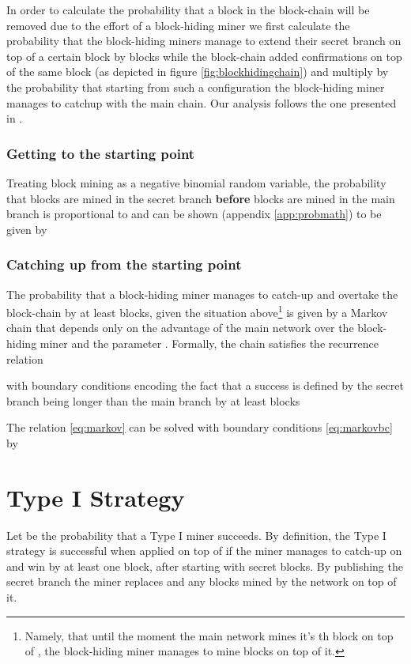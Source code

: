 \documentclass[letterpaper,12pt]{report}
\begin{document}
In order to calculate the probability that a block in the block-chain will be removed due to the effort of a block-hiding miner we first calculate the probability that the block-hiding miners manage to extend their secret branch on top of a certain block by  blocks while the block-chain added  confirmations on top of the same block (as depicted in figure \ref{fig:blockhidingchain}) and multiply by the probability that starting from such a configuration the block-hiding miner manages to catchup with the main chain. Our analysis follows the one presented in \cite{Doublespend}.

\subsection{Getting to the starting point}
Treating block mining as a negative binomial random variable, the probability  that  blocks are mined in the secret branch {\bf before}  blocks are mined in the main branch is proportional to  and can be shown
(appendix \ref{app:probmath}) to be given by



\subsection{Catching up from the starting point}
The probability  that a block-hiding miner manages to catch-up and overtake the block-chain by at least  blocks, given the situation above\footnote{Namely, that until the moment the main network mines it's th block on top of , the block-hiding miner manages to mine  blocks on top of it.} is given by a Markov chain that depends only on the advantage  of the main network over the block-hiding miner and the parameter . Formally, the chain satisfies the recurrence relation


with boundary conditions encoding the fact that a success is defined by the secret branch being longer than the main branch by at least  blocks



The relation \ref{eq:markov} can be solved with boundary conditions \ref{eq:markovbc} by 






\chapter{Type I Strategy}

Let  be the probability that a Type I miner succeeds. By definition, the Type I strategy is successful when applied on top of  if the miner manages to catch-up on  and win by at least one block, after starting with  secret blocks. 
By publishing the secret branch the miner replaces  and any blocks mined by the network on top of it. 
\end{document}
